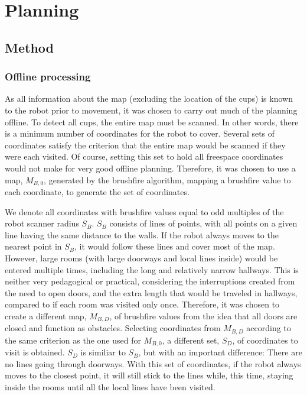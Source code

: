 \section{Planning}
\subsection{Method}
\subsubsection{Offline processing}

As all information about the map (excluding the location of the cups) is known to the robot prior to movement,
it was chosen to carry out much of the planning offline.
To detect all cups, the entire map must be scanned.
In other words, there is a minimum number of coordinates for the robot to cover.
Several sets of coordinates satisfy the criterion that the entire map would be scanned if they were each visited.
Of course, setting this set to hold all freespace coordinates would not make for very good offline planning.
Therefore, it was chosen to use a map, \(M_{B,0}\), generated by the brushfire algorithm,
mapping a brushfire value to each coordinate, to generate the set of coordinates.

We denote all coordinates with brushfire values equal to odd multiples of the robot scanner radius \(S_{B}\).
\(S_{B}\) consists of lines of points, with all points on a given line having the same distance to the walls.
If the robot always moves to the nearest point in \(S_{B}\),
it would follow these lines and cover most of the map.
However, large rooms (with large doorways and local lines inside) would be entered multiple times,
including the long and relatively narrow hallways.
This is neither very pedagogical or practical, considering the interruptions created
from the need to open doors, and the extra length that would be traveled
in hallways, compared to if each room was visited only once.
Therefore, it was chosen to create a different map, \(M_{B,D}\), of brushfire values from the idea
that all doors are closed and function as obstacles.
Selecting coordinates from \(M_{B,D}\) according to the same criterion as the one used for \(M_{B,0}\),
a different set, \(S_{D}\), of coordinates to visit is obtained.
\(S_{D}\) is similiar to \(S_{B}\), but with an important difference:
There are no lines going through doorways.
With this set of coordinates, if the robot always moves to the closest point,
it will still stick to the lines while, this time, staying inside the rooms until all the local lines
have been visited.

